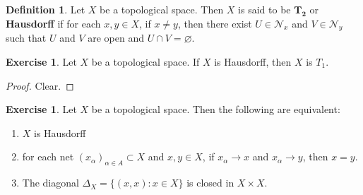 \documentclass[12pt]{amsart}
\theoremstyle{definition}
\newtheorem{defn}[definition]{Definition}
\newtheorem{ex}[definition]{Exercise}
\newcommand{\al}{\alpha}
\newcommand{\Del}{\Delta}
\newcommand{\MN}{\mathcal{N}}
\begin{document}
	\begin{defn}
		Let $X$ be a topological space. Then $X$ is said to be $\mathbf{T_2}$ or \textbf{Hausdorff} if for each $x,y \in X$, if $x \neq y$, then there exist $U \in \MN_x$ and $V \in \MN_y$ such that $U$ and $V$ are open and $U \cap V = \varnothing$.
	\end{defn}
	
	\begin{ex}
		Let $X$ be a topological space. If $X$ is Hausdorff, then $X$ is $T_1$.
	\end{ex}
	
	\begin{proof}
		Clear.
	\end{proof}
	
	\begin{ex}
		Let $X$ be a topological space. Then the following are equivalent: 
		\begin{enumerate}
			\item $X$ is Hausdorff
			\item for each net $(x_{\al})_{\al \in A} \subset X$ and $x,y \in X$, if $x_{\al} \rightarrow x$ and $x_{\al} \rightarrow y$, then $x = y$.
			\item The diagonal $\Del_X = \{(x,x):x \in X\}$ is closed in $X \times X$.
		\end{enumerate} 
	\end{ex}
	
\end{document}

